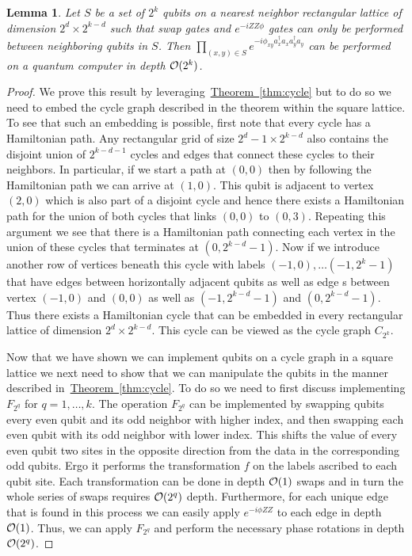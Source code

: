 \documentclass[superscriptaddress,aps,pra,nofootinbib,notitlepage,10pt,longbibliography]{revtex4-1}
\newtheorem{lemma}[theorem]{Lemma}
\newcommand{\thm}[1]{\hyperref[thm:#1]{Theorem~\ref*{thm:#1}}}
\begin{document}
\begin{lemma}\label{lem:gates}
Let $S$ be a set of $2^k$ qubits on a nearest neighbor rectangular lattice of dimension $2^{d}\times 2^{k-d}$ such that swap gates and $e^{-iZZ\phi}$ gates can only be performed between neighboring qubits in $S$.  Then $\prod_{(x,y)\in S} e^{-i\phi_{xy} a_x^\dagger a_x a_y^\dagger a_y}$ can be performed on a quantum computer in depth ${\cal O}(2^k)$.
\end{lemma}
\begin{proof}
We prove this result by leveraging~\thm{cycle} but to do so we need to embed the cycle graph described in the theorem within the square lattice.  To see that such an embedding is possible, first note that every cycle has a Hamiltonian path.  Any rectangular grid of size $2^{d}-1 \times 2^{k-d}$ also contains the disjoint union of $2^{k-d-1}$ cycles and edges that connect these cycles to their neighbors.  In particular, if we start a path at $(0,0)$ then by following the Hamiltonian path we can arrive at $(1,0)$.  This qubit is adjacent to vertex $(2,0)$ which is also part of a disjoint cycle and hence there exists a Hamiltonian path for the union of both cycles that links $(0,0)$ to $(0,3)$.  Repeating this argument we see that there is a Hamiltonian path connecting each vertex in the union of these cycles that terminates at $(0,2^{k-d} -1)$.  Now if we introduce another row of vertices beneath this cycle with labels $(-1,0),\ldots (-1,2^{k}-1)$ that have edges between horizontally adjacent qubits as well as edge s between vertex $(-1,0)$ and $(0,0)$ as well as $(-1,2^{k-d}-1)$ and $(0,2^{k-d}-1)$.  Thus there exists a Hamiltonian cycle that can be embedded in every rectangular lattice of dimension $2^{d} \times 2^{k-d}$.  This cycle can be viewed as the cycle graph $C_{2^{k}}$.

Now that we have shown we can implement qubits on a cycle graph in a square lattice we next need to show that we can manipulate the qubits in the manner described in~\thm{cycle}.  To do so we need to first discuss implementing $F_{2^q}$ for $q=1,\ldots,k$.
The operation $F_{2^q}$ can be implemented by swapping qubits every even qubit and its odd neighbor with higher index, and then swapping each even qubit with its odd neighbor with lower index.  This shifts the value of every even qubit two sites in the opposite direction from the data in the corresponding odd qubits.  Ergo it performs the transformation $f$ on the labels ascribed to each qubit site.  Each transformation can be done in depth ${\cal O}(1)$ swaps and in turn the whole series of swaps requires ${\cal O}(2^{q})$ depth.  Furthermore, for each unique edge that is found in this process we can easily apply $e^{-i\phi ZZ}$ to each edge in depth ${\cal O}(1)$.  Thus, we can apply $F_{2^q}$ and perform the necessary phase rotations in depth ${\cal O}(2^{q})$.


\end{proof}
\end{document}
